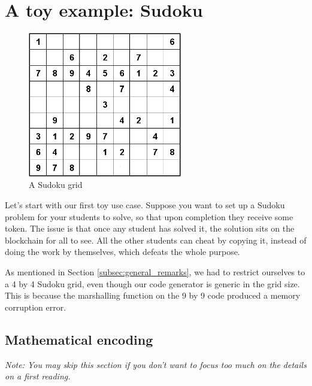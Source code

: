 \documentclass[10pt,a4paper]{article}
\begin{document}
\section{A toy example: Sudoku}
\label{section_sudoku}

	\begin{figure}[!h]
	\centering
	\includegraphics[width=0.6\textwidth]{Sudoku04}
	\caption{A Sudoku grid}
	\end{figure}


Let's start with our first toy use case. Suppose you want to set up a Sudoku problem for your students to solve, so that upon completion they receive some token. The issue is that once any student has solved it, the solution sits on the blockchain for all to see. All the other students can cheat by copying it, instead of doing the work by themselves, which defeats the whole purpose.

As mentioned in Section \ref{subsec:general_remarks}, we had to restrict ourselves to a 4 by 4 Sudoku grid, even though our code generator is generic in the grid size. This is because the marshalling function on the 9 by 9 code produced a memory corruption error.

\subsection{Mathematical encoding}
\label{subsec:math_enc}

\emph{Note: You may skip this section if you don't want to focus too much on the details on a first reading.}
\end{document}

